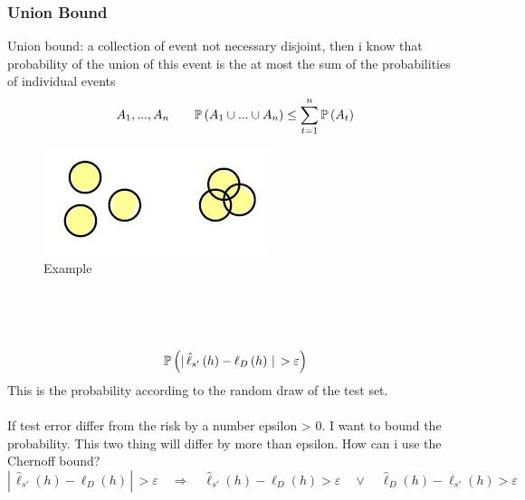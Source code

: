 \documentclass[../main.tex]{subfiles}
\begin{document}
\subsubsection{Union Bound}
Union bound: a collection of event not necessary disjoint, then i know
that probability of the union of this event is the at most the sum of the
probabilities of individual events
$$
A_1, ..., A_n \qquad \mathbb{P}\left( A_1 \cup ... \cup A_n \right) \leq \sum_{t=1}^{n} \mathbb{P} \left(A_t\right)
$$
\begin{figure}[h]
    \centering
    \includegraphics[width=0.3\linewidth]{../img/lez7-img1.JPG}
    \caption{Example}
\end{figure}\\
\\\\
$$
\mathbb{P} \left(|\,\hat{\ell}_{s'} \left( h \right) - \ell_D\left( h \right) \, | \, > \varepsilon \right)
$$
This is the probability according to the random draw of the test set.\\
\\
If test error differ from the risk by a number epsilon > 0. I want to bound the
probability. This two thing will differ by more than epsilon. How can i use the
Chernoff bound?
$$
|\,\hat{\ell}_{s'} \left( h \right) - \ell_D\left( h \right) \, | \, > \varepsilon  \quad \Rightarrow \quad 
\hat{\ell}_{s'}\left(h\right)-\ell_D\left(h\right) > \varepsilon \quad \vee \quad
\hat{\ell}_D \left(h\right)-\ell_{s'}\left(h\right) > \varepsilon
$$
\end{document}
